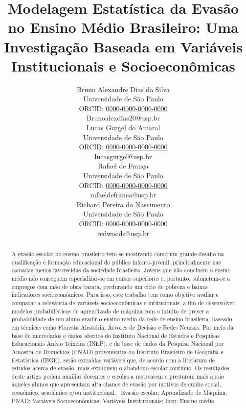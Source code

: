 \documentclass[english, spanish, brazilian]{RBIEarticle} %
\title{Modelagem Estatística da Evasão no Ensino Médio Brasileiro: Uma Investigação Baseada em Variáveis Institucionais e Socioeconômicas}
\author{%
	\parbox{3.8cm}{%
		Bruno Alexandre Dias da Silva\\
		Universidade de São Paulo\\
		ORCID: \href{https://orcid.org/0000-0000-0000-0000}{0000-0000-0000-0000}\\
		Brunoalexdias20@usp.br
	}
        \hspace{0.3cm}
	\parbox{3.8cm}{%
		Lucas Gurgel do Amaral\\
		Universidade de São Paulo\\
		ORCID: \href{https://orcid.org/0000-0000-0000-0000}{0000-0000-0000-0000}\\
		lucasgurgel@usp.br
	}
        \hspace{0.3cm}
        \parbox{3.8cm}{%
		Rafael de França\\
		Universidade de São Paulo\\
		ORCID: \href{https://orcid.org/0000-0000-0000-0000}{0000-0000-0000-0000}\\
		rafaeldefranca@usp.br
	}
        \hspace{0.3cm}
	\parbox{3.9cm}{\raggedright%
		Richard Pereira do Nascimento\\
		Universidade de São Paulo\\
		ORCID: \href{https://orcid.org/0000-0000-0000-0000}{0000-0000-0000-0000}\\
		rcdwoods@usp.br
	}
}
\begin{document}
\maketitle

\begin{otherlanguage}{brazilian}
\begin{abstract}
A evasão escolar no ensino brasileiro vem se mostrando como um grande desafio na qualificação e formação educacional do público infanto-juvenil, principalmente nas camadas menos favorecidas da sociedade brasileira. Jovens que não concluem o ensino médio não conseguem especializar-se em cursos superiores e, portanto, submetem-se a empregos com mão de obra barata, perdurando um ciclo de pobreza e baixos indicadores socioeconômicos. Para isso, este trabalho tem como objetivo avaliar e comparar a relevância de variáveis socioeconômicas e intitucionais, a fim de desenvolver modelos probabilísticos de aprendizado de máquina com o intuito de prever a probabilidade de um aluno evadir o ensino médio da rede de ensino brasileira, baseado em técnicas como Floresta Aleatória, Árvores de Decisão e Redes Neurais. Por meio da base de microdados e dados abertos do Instituto Nacional de Estudos e Pesquisas Educacionais Anísio Teixeira (INEP), e da base de dados da Pesquisa Nacional por Amostra de Domicílios (PNAD) provenientes do Instituto Brasileiro de Geografia e Estatística (IBGE), serão extraídas variáveis que, de acordo com a literatura de estudos acerca de evasão, mais expliquem o abandono escolar contínuo. Os resultados deste artigo podem auxiliar docentes e escolas a rastrearem e prestarem mais apoio àqueles alunos que apresentam alta chance de evasão por motivos de cunho social, econômico, acadêmico e/ou institucional.
\keywords\ Evasão escolar; Aprendizado de Máquina; PNAD; Variáveis Socioeconômicas; Variáveis Institucionais; Inep; Ensino médio.
\end{abstract}
\end{otherlanguage}
\end{document}
